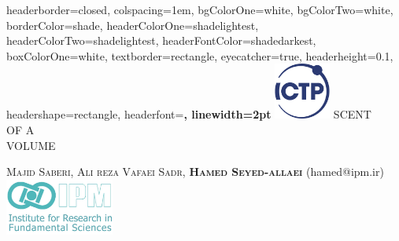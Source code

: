 \documentclass[a1paper,fontscale=0.6]{baposter} %
\begin{document}
\begin{poster}
{
headerborder=closed, %
colspacing=1em, %
bgColorOne=white, %
bgColorTwo=white, %
borderColor=shade, %
headerColorOne=shadelightest, %
headerColorTwo=shadelightest, %
headerFontColor=shadedarkest, %
boxColorOne=white, %
textborder=rectangle, %
eyecatcher=true, %
headerheight=0.1\textheight, %
headershape=rectangle, %
headerfont=\Large\bf\textsc, %
linewidth=2pt %
}
%
{\includegraphics[height=5em]{fig/ICTP_logo}} %
{{\Huge SCENT  {\\ \small OF A \\ } VOLUME}}

{\textsc{ Majid Saberi, Ali reza Vafaei Sadr, \bf{Hamed Seyed-allaei} \vspace{0.5em} }(hamed@ipm.ir)}
{\includegraphics[height=5em]{fig/logo.jpg}} %


\end{poster}
\end{document}
